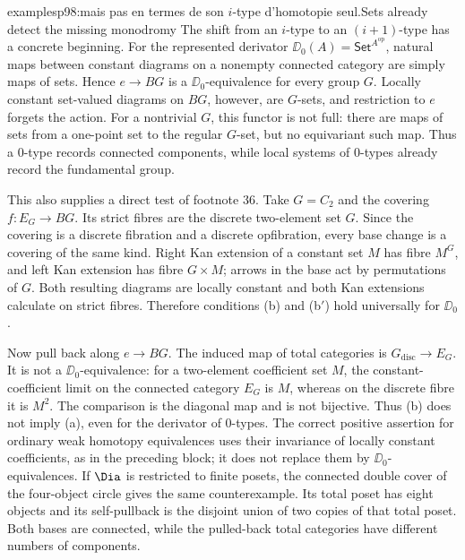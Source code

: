 \begin{dcomment}{examples}{p98:mais pas en termes de son $i$-type d’homotopie seul.}{Sets already detect the missing monodromy}
The shift from an $i$-type to an $(i+1)$-type has a concrete beginning. For the represented derivator
$\DD_0(A)=\mathsf{Set}^{A^{\mathrm{op}}}$, natural maps between constant diagrams on a nonempty connected category are simply maps of sets. Hence $e\to BG$ is a $\DD_0$-equivalence for every group $G$. Locally constant set-valued diagrams on $BG$, however, are $G$-sets, and restriction to $e$ forgets the action. For a nontrivial $G$, this functor is not full: there are maps of sets from a one-point set to the regular $G$-set, but no equivariant such map. Thus a $0$-type records connected components, while local systems of $0$-types already record the fundamental group.

This also supplies a direct test of footnote 36. Take $G=C_2$ and the covering $f:E_G\to BG$. Its strict fibres are the discrete two-element set $G$. Since the covering is a discrete fibration and a discrete opfibration, every base change is a covering of the same kind. Right Kan extension of a constant set $M$ has fibre $M^G$, and left Kan extension has fibre $G\times M$; arrows in the base act by permutations of $G$. Both resulting diagrams are locally constant and both Kan extensions calculate on strict fibres. Therefore conditions (b) and (b$'$) hold universally for $\DD_0$.

Now pull back along $e\to BG$. The induced map of total categories is $G_{\mathrm{disc}}\to E_G$. It is not a $\DD_0$-equivalence: for a two-element coefficient set $M$, the constant-coefficient limit on the connected category $E_G$ is $M$, whereas on the discrete fibre it is $M^2$. The comparison is the diagonal map and is not bijective. Thus (b) does not imply (a), even for the derivator of $0$-types. The correct positive assertion for ordinary weak homotopy equivalences uses their invariance of locally constant coefficients, as in the preceding block; it does not replace them by $\DD_0$-equivalences. If $\Dia$ is restricted to finite posets, the connected double cover of the four-object circle gives the same counterexample. Its total poset has eight objects and its self-pullback is the disjoint union of two copies of that total poset. Both bases are connected, while the pulled-back total categories have different numbers of components.
\end{dcomment}

